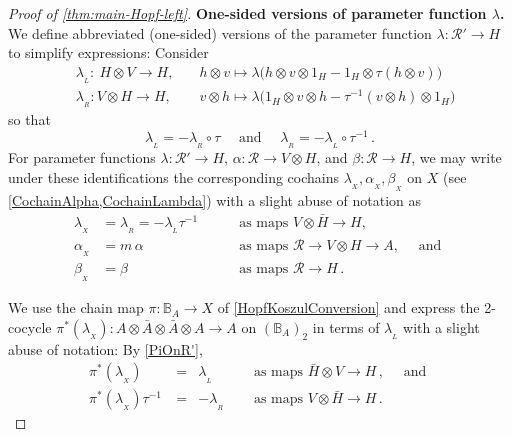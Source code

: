 \documentclass[11pt]{amsart}
\numberwithin{equation}{section}
\newcommand{\X}{_X}
\newcommand{\alphax}{\alpha_{\X}}
\newcommand{\betax}{\beta_{\X}}
\newcommand{\lambdax}{\lambda_{\X}}
\newcommand{\bA}{\bar{\A}}
\newcommand{\A}{A}%
\newcommand{\sA}{A }
\newcommand{\R}{\mathcal{R}}
\newcommand{\BB}{\mathbb{B}} %
\newcommand{\itau}{{\tau^{-1}}}%
\renewcommand{\_}[1]{\mbox{$_{\left( #1 \right)}$}}
\newcommand{\ot}{\otimes}
\begin{document}
{\begin{proof}[Proof of \cref{thm:main-Hopf-left}]
{\bf One-sided versions of parameter function $\lambda$.}
  We define abbreviated (one-sided) versions of the parameter function
  $\lambda:\R'\rightarrow H$
  to simplify expressions: Consider
\begin{equation}\label{lambda'}
\begin{aligned}
& \lambda_{_L}: \ H\ot V\longrightarrow H, \quad 
& h\ot v \mapsto\lambda\big(h\ot v\ot 1_H - 1_H\ot \tau(h\ot v)\big)
\\
& \lambda_{_R}: V\ot H\longrightarrow H, \quad 
& v\ot h \mapsto\lambda\big(1_H\ot v\ot h -  \itau(v\ot h)\ot 1_H \big)
\end{aligned}
\end{equation}
so that  
\begin{equation}\label{LambdaSwitchSides}
  \lambda_{_L}=-\lambda_{_R}\circ \tau
  \quad\text{ and }\quad
  \lambda_{_R}=-\lambda_{_L}\circ \itau
  \, .
  \end{equation}
%
For parameter functions $\lambda:\R'\rightarrow H$,
$\alpha:\R\rightarrow V\ot H$, 
and $\beta:\R\rightarrow H$, we may write under these identifications
the corresponding cochains $\lambdax, \alphax, \betax$ on $X$ (see
\cref{CochainAlpha,CochainLambda})
with a slight abuse of notation as
\begin{equation}\label{CochainsToParameters}
\begin{aligned}
\lambdax &= \lambda_{_R}  = -\lambda_{_L}\itau
&&\quad\text{ as maps } V\ot \bar H\rightarrow H,
\\
\alphax &=m\, \alpha 
&&\quad\text{ as maps } \R\rightarrow V\ot H\rightarrow A,
\quad\text{ and }
\\
 \betax &=\beta 
 &&\quad\text{ as maps } \R\rightarrow H
 \, .
\end{aligned}
\end{equation}

We use the chain map $\pi: \BB_A\rightarrow X$
of \cref{HopfKoszulConversion}
and express the 2-cocycle
$\pi^* ( \lambdax ) : A\ot \bA\ot\bA\ot A \rightarrow A$
on $(\BB_A)_2$ in terms of $\lambda_{_L}$
with a slight abuse of notation:
  By \cref{PiOnR'},
  \begin{equation}\label{PiLambdax}
  \begin{aligned}
    \pi^* (\lambdax)\
    & = & \lambda_{_L}
  &\quad\text{ as maps } \bar H\ot V \longrightarrow H\, ,
  \quad\text{ and }\\
  \pi^* (\lambdax) \itau\  & = & - \lambda_{_R}
 &\quad\text{ as maps } V\ot \bar H \longrightarrow H
 \,  .
\end{aligned}
\end{equation}


\end{proof}}
\end{document}
